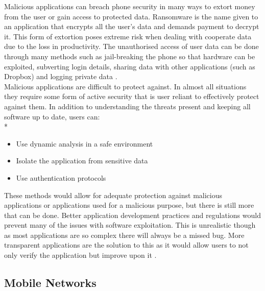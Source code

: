 Malicious applications can breach phone security in many ways to extort money from the user or gain access to protected data.
Ransomware is the name given to an application that encrypts all the user’s data and demands payment to decrypt it.
This form of extortion poses extreme risk when dealing with cooperate data due to the loss in productivity.
The unauthorised access of user data can be done through many methods such as jail-breaking the phone so that hardware can be exploited, subverting login details, sharing data with other applications (such as Dropbox) and logging private data \cite{Reference13}.\\
Malicious applications are difficult to protect against.
In almost all situations they require some form of active security that is user reliant to effectively protect against them.
In addition to understanding the threats present and keeping all software up to date, users can:\\*
\begin{itemize}
\item Use dynamic analysis in a safe environment
\item Isolate the application from sensitive data
\item Use authentication protocols
\end{itemize}
These methods would allow for adequate protection against malicious applications or applications used for a malicious purpose, but there is still more that can be done.
Better application development practices and regulations would prevent many of the issues with software exploitation.
This is unrealistic though as most applications are so complex there will always be a missed bug.
More transparent applications are the solution to this as it would allow users to not only verify the application but improve upon it \cite{Reference13}.


\subsection{Mobile Networks}

\label{Ch2 Sec2 Sub3}

